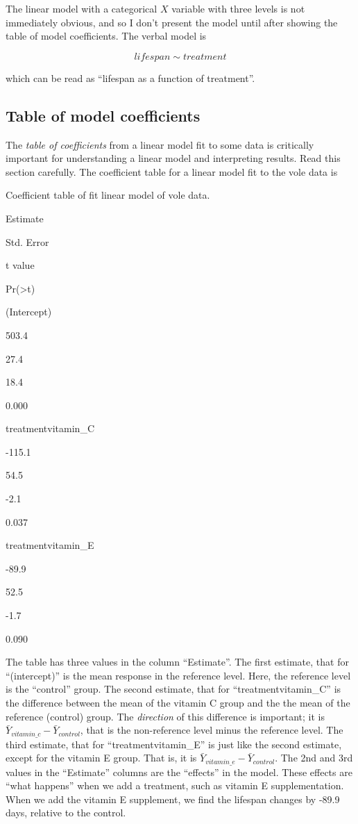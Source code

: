 \documentclass[]{book}
\begin{document}
The linear model with a categorical \(X\) variable with three levels is
not immediately obvious, and so I don't present the model until after
showing the table of model coefficients. The verbal model is

\begin{equation}
lifespan \sim treatment
\end{equation}

which can be read as ``lifespan as a function of treatment''.

\subsection{Table of model
coefficients}\label{table-of-model-coefficients}

The \emph{table of coefficients} from a linear model fit to some data is
critically important for understanding a linear model and interpreting
results. Read this section carefully. The coefficient table for a linear
model fit to the vole data is

\label{tab:vole-table}Coefficient table of fit linear model of vole data.

Estimate

Std. Error

t value

Pr(\textgreater{}\textbar{}t\textbar{})

(Intercept)

503.4

27.4

18.4

0.000

treatmentvitamin\_C

-115.1

54.5

-2.1

0.037

treatmentvitamin\_E

-89.9

52.5

-1.7

0.090

The table has three values in the column ``Estimate''. The first
estimate, that for ``(intercept)'' is the mean response in the reference
level. Here, the reference level is the ``control'' group. The second
estimate, that for ``treatmentvitamin\_C'' is the difference between the
mean of the vitamin C group and the the mean of the reference (control)
group. The \emph{direction} of this difference is important; it is
\(\bar{Y}_{vitamin\_c} - \bar{Y}_{control}\), that is the non-reference
level minus the reference level. The third estimate, that for
``treatmentvitamin\_E'' is just like the second estimate, except for the
vitamin E group. That is, it is
\(\bar{Y}_{vitamin\_e} - \bar{Y}_{control}\). The 2nd and 3rd values in
the ``Estimate'' columns are the ``effects'' in the model. These effects
are ``what happens'' when we add a treatment, such as vitamin E
supplementation. When we add the vitamin E supplement, we find the
lifespan changes by -89.9 days, relative to the control.
\end{document}
